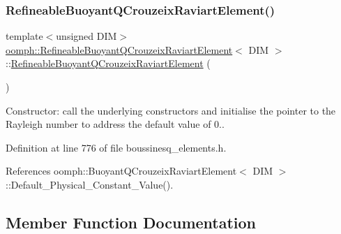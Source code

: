 \subsubsection{\texorpdfstring{Refineable\+Buoyant\+Q\+Crouzeix\+Raviart\+Element()}{RefineableBuoyantQCrouzeixRaviartElement()}}
{\footnotesize\ttfamily template$<$unsigned D\+IM$>$ \\
\hyperlink{classoomph_1_1RefineableBuoyantQCrouzeixRaviartElement}{oomph\+::\+Refineable\+Buoyant\+Q\+Crouzeix\+Raviart\+Element}$<$ D\+IM $>$\+::\hyperlink{classoomph_1_1RefineableBuoyantQCrouzeixRaviartElement}{Refineable\+Buoyant\+Q\+Crouzeix\+Raviart\+Element} (\begin{DoxyParamCaption}{ }\end{DoxyParamCaption})\hspace{0.3cm}{\ttfamily [inline]}}



Constructor\+: call the underlying constructors and initialise the pointer to the Rayleigh number to address the default value of 0.. 



Definition at line 776 of file boussinesq\+\_\+elements.\+h.



References oomph\+::\+Buoyant\+Q\+Crouzeix\+Raviart\+Element$<$ D\+I\+M $>$\+::\+Default\+\_\+\+Physical\+\_\+\+Constant\+\_\+\+Value().



\subsection{Member Function Documentation}
\mbox{\label{classoomph_1_1RefineableBuoyantQCrouzeixRaviartElement_ad239e9a0ebe88136d68e1521fc51e0bb}} 
